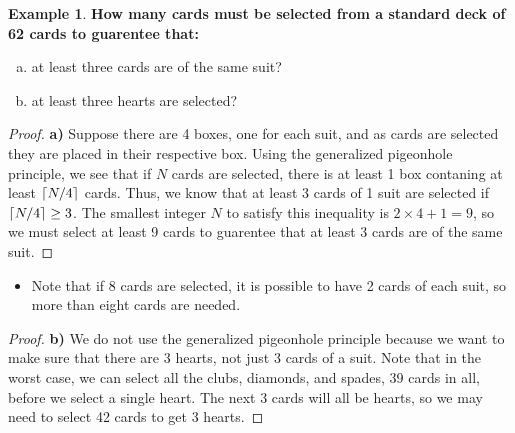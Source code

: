 \documentclass[article, 11pt]{article}
\theoremstyle{definition}
\newtheorem{example}{Example}[subsubsection]
\DeclarePairedDelimiter\ceil{\lceil}{\rceil} %
\begin{document}
    \begin{example}
        \textbf{How many cards must be selected from a standard deck of 62 cards to guarentee that:}
        \begin{enumerate}[a)]
            \item at least three cards are of the same suit?
            \item at least three hearts are selected?
        \end{enumerate}
        \begin{proof}
            \textbf{a)} Suppose there are 4 boxes, one for each suit, and as cards are selected they are placed in their respective box. Using the generalized pigeonhole principle, we see that if $N$ cards are selected, there is at least 1 box contaning at least $\ceil*{N/4}$ cards. Thus, we know that at least 3 cards of 1 suit are selected if $\ceil*{N/4} \geq 3$. The smallest integer $N$ to satisfy this inequality is $2\times 4+1=9$, so we must select at least 9 cards to guarentee that at least 3 cards are of the same suit.
        \end{proof}
        \begin{itemize}
            \item Note that if 8 cards are selected, it is possible to have 2 cards of each suit, so more than eight cards are needed.
        \end{itemize} 
    \begin{proof}
        \textbf{b)} We do not use the generalized pigeonhole principle because we want to make sure that there are 3 hearts, not just 3 cards of a suit. Note that in the worst case, we can select all the clubs, diamonds, and spades, 39 cards in all, before we select a single heart. The next 3 cards will all be hearts, so we may need to select 42 cards to get 3 hearts.
    \end{proof}
    \end{example}
\end{document}
